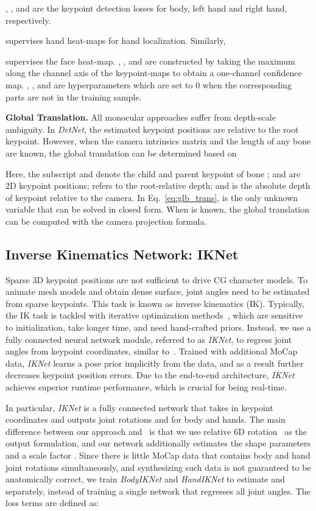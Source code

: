 \documentclass[final]{cvpr}
\begin{document}
, , and  are the keypoint detection losses for body, left hand and right hand, respectively.

supervises hand heat-maps for hand localization.
Similarly,

supervises the face heat-map.
, , and  are constructed by taking the maximum along the channel axis of the keypoint-maps to obtain a one-channel confidence map.
, , and  are hyperparameters which are set to 0 when the corresponding parts are not in the training sample.
\par
\noindent \textbf{Global Translation.}
All monocular approaches suffer from depth-scale ambiguity.
In \textit{DetNet}, the estimated keypoint positions are relative to the root keypoint.
However, when the camera intrinsics matrix  and the length of any bone  are known, the global translation can be determined based on

Here, the subscript  and  denote the child and parent keypoint of bone ;
 and  are 2D keypoint positions;
 refers to the root-relative depth;
and  is the absolute depth of keypoint  relative to the camera.
In Eq.~\ref{eq:glb_trans},  is the only unknown variable that can be solved in closed form.
When  is known, the global translation can be computed with the camera projection formula.
 \subsection{Inverse Kinematics Network: IKNet}
\label{sec:IKNet}
Sparse 3D keypoint positions are not sufficient to drive CG character models.
To animate mesh models and obtain dense surface, joint angles need to be estimated from sparse keypoints.
This task is known as inverse kinematics (IK).
Typically, the IK task is tackled with iterative optimization methods~\cite{bogo2016keep,guan2009estimating,xiang2019monocular,xu2018monoperfcap,habermann2019livecap,tkach2016sphere}, which are sensitive to initialization, take longer time, and need hand-crafted priors.
Instead, we use a fully connected neural network module, referred to as \textit{IKNet}, to regress joint angles from keypoint coordinates, similar to~\cite{zhou2020monocular}.
Trained with additional MoCap data, \textit{IKNet} learns a pose prior implicitly from the data, and as a result further decreases keypoint position errors.
Due to the end-to-end architecture, \textit{IKNet} achieves superior runtime performance, which is crucial for being real-time.
\par
In particular, \textit{IKNet} is a fully connected network that takes in keypoint coordinates and outputs joint rotations  and  for body and hands.
The main difference between our approach and~\cite{zhou2020monocular} is that we use relative 6D rotation~\cite{zhou2019continuity} as the output formulation, and our network additionally estimates the shape parameters  and a scale factor .
Since there is little MoCap data that contains body and hand joint rotations simultaneously, and synthesizing such data is not guaranteed to be anatomically correct, we train \textit{BodyIKNet} and \textit{HandIKNet} to estimate  and  separately, instead of training a single network that regresses all joint angles.
The loss terms are defined as:
\end{document}
